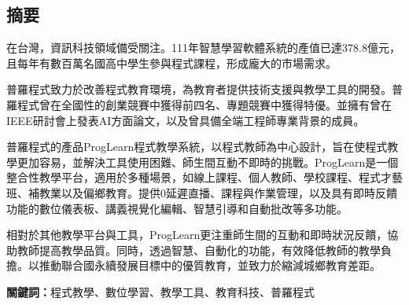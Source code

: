 \begin{center}
  \section*{摘要}
\end{center}

在台灣，資訊科技領域備受關注。111年智慧學習軟體系統的產值已達378.8億元，且每年有數百萬名國高中學生參與程式課程，形成龐大的市場需求。

普羅程式致力於改善程式教育環境，為教育者提供技術支援與教學工具的開發。普羅程式曾在全國性的創業競賽中獲得前四名、專題競賽中獲得特優。並擁有曾在IEEE研討會上發表AI方面論文，以及曾具備全端工程師專業背景的成員。

普羅程式的產品ProgLearn程式教學系統，以程式教師為中心設計，旨在使程式教學更加容易，並解決工具使用困難、師生間互動不即時的挑戰。ProgLearn是一個整合性教學平台，適用於多種場景，如線上課程、個人教師、學校課程、程式才藝班、補教業以及偏鄉教育。提供0延遲直播、課程與作業管理，以及具有即時反饋功能的數位儀表板、講義視覺化編輯、智慧引導和自動批改等多功能。

相對於其他教學平台與工具，ProgLearn更注重師生間的互動和即時狀況反饋，協助教師提高教學品質。同時，透過智慧、自動化的功能，有效降低教師的教學負擔。以推動聯合國永續發展目標中的優質教育，並致力於縮減城鄉教育差距。
\\ \par \noindent
\textbf{關鍵詞：}程式教學、數位學習、教學工具、教育科技、普羅程式